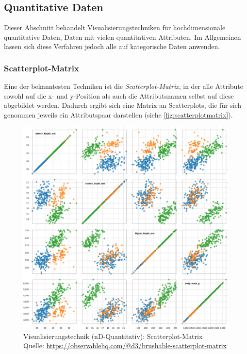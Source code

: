 		\subsection{Quantitative Daten}
			Dieser Abschnitt behandelt Visualisierungstechniken für hochdimensionale quantitative Daten, \dh Daten mit vielen quantitativen Attributen. Im Allgemeinen lassen sich diese Verfahren jedoch alle auf kategorische Daten anwenden.

			\subsubsection{Scatterplot-Matrix}
				Eine der bekanntesten Techniken ist die \emph{Scatterplot-Matrix}, in der alle Attribute sowohl auf die x- und y-Position als auch die Attributsnamen selbst auf diese abgebildet werden. Dadurch ergibt sich eine Matrix an Scatterplots, die für sich genommen jeweils ein Attributspaar darstellen (siehe \autoref{fig:scatterplotmatrix}).

				\begin{figure}
					\centering
					\includegraphics[width=\linewidth]{scatterplotmatrix}
					\caption[Visualisierungstechnik (nD-Quantitativ): Scatterplot-Matrix]{Visualisierungstechnik (nD-Quantitativ): Scatterplot-Matrix\\Quelle: \url{https://observablehq.com/@d3/brushable-scatterplot-matrix}}
					\label{fig:scatterplotmatrix}
				\end{figure}

